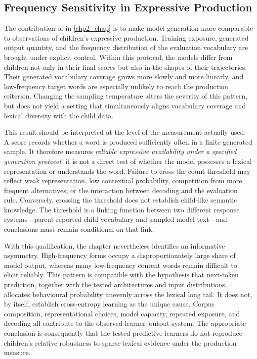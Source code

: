 \subsection{Frequency Sensitivity in Expressive Production}

The contribution of \meCDI{} in \cref{chp2_chap} is to make model generation more comparable to observations of children's expressive production. Training exposure, generated output quantity, and the frequency distribution of the evaluation vocabulary are brought under explicit control. Within this protocol, the models differ from children not only in their final scores but also in the shapes of their trajectories. Their generated vocabulary coverage grows more slowly and more linearly, and low-frequency target words are especially unlikely to reach the production criterion. Changing the sampling temperature alters the severity of this pattern, but does not yield a setting that simultaneously aligns vocabulary coverage and lexical diversity with the child data.

This result should be interpreted at the level of the measurement actually used. A \meCDI{} score records whether a word is produced sufficiently often in a finite generated sample. It therefore measures \emph{reliable expressive availability under a specified generation protocol}; it is not a direct test of whether the model possesses a lexical representation or understands the word. Failure to cross the count threshold may reflect weak representation, low contextual probability, competition from more frequent alternatives, or the interaction between decoding and the evaluation rule. Conversely, crossing the threshold does not establish child-like semantic knowledge. The threshold is a linking function between two different response systems---parent-reported child vocabulary and sampled model text---and conclusions must remain conditional on that link.

With this qualification, the chapter nevertheless identifies an informative asymmetry. High-frequency forms occupy a disproportionately large share of model output, whereas many low-frequency content words remain difficult to elicit reliably. This pattern is compatible with the hypothesis that next-token prediction, together with the tested architectures and input distributions, allocates behavioural probability unevenly across the lexical long tail. It does not, by itself, establish cross-entropy learning as the unique cause. Corpus composition, representational choices, model capacity, repeated exposure, and decoding all contribute to the observed learner--output system. The appropriate conclusion is consequently that the tested predictive learners do not reproduce children's relative robustness to sparse lexical evidence under the \meCDI{} production measure.

